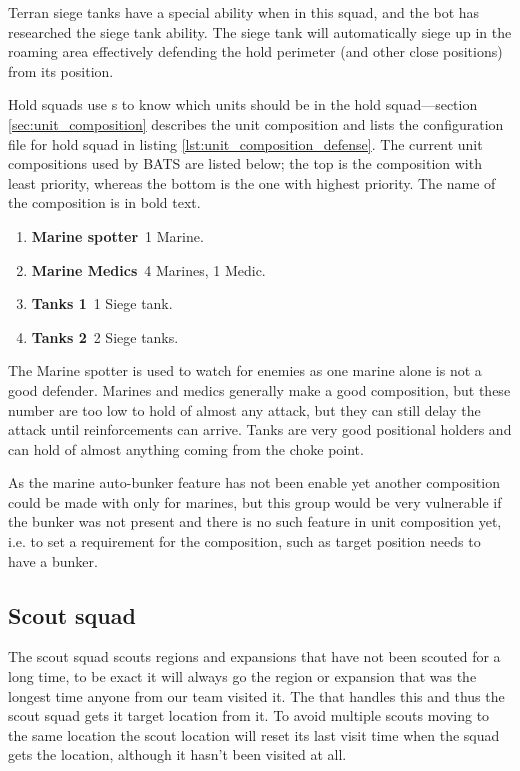 Terran siege tanks have a special ability when in this squad, and the bot has researched the siege tank ability. The siege tank will automatically siege up in the roaming area effectively defending the hold perimeter (and other close positions) from its position.

Hold squads use s to know which units should be in the hold squad—section \ref{sec:unit_composition} describes the unit composition and lists the configuration file for hold squad in listing \ref{lst:unit_composition_defense}. The current unit compositions used by BATS are listed below; the top is the composition with least priority, whereas the bottom is the one with highest priority. The name of the composition is in bold text.

\begin{enumerate}
	\item \textbf{Marine spotter}~1 Marine.
	\item \textbf{Marine Medics}~4 Marines, 1 Medic.
	\item \textbf{Tanks 1}~1 Siege tank.
	\item \textbf{Tanks 2}~2 Siege tanks.
\end{enumerate}
The Marine spotter is used to watch for enemies as one marine alone is not a good defender. Marines and medics generally make a good composition, but these number are too low to hold of almost any attack, but they can still delay the attack until reinforcements can arrive. Tanks are very good positional holders and can hold of almost anything coming from the choke point. 

As the marine auto-bunker feature has not been enable yet another composition could be made with only for marines, but this group would be very vulnerable if the bunker was not present and there is no such feature in unit composition yet, i.e. to set a requirement for the composition, such as target position needs to have a bunker.

\subsection{Scout squad}
\label{sec:scout_squad}
The scout squad scouts regions and expansions that have not been scouted for a long time, to be exact it will always go the region or expansion that was the longest time anyone from our team visited it. The  that handles this and thus the scout squad gets it target location from it. To avoid multiple scouts moving to the same location the scout location will reset its last visit time when the squad gets the location, although it hasn't been visited at all.

